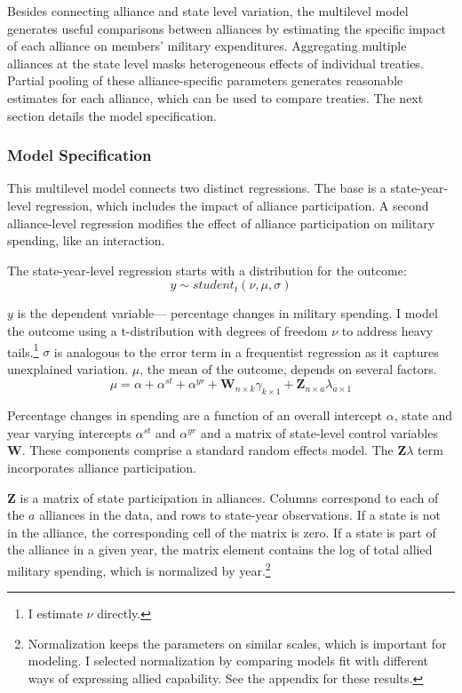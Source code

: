 \documentclass[12pt]{article}
\begin{document}
Besides connecting alliance and state level variation, the multilevel model generates useful comparisons between alliances by estimating the specific impact of each alliance on members' military expenditures. 
Aggregating multiple alliances at the state level masks heterogeneous effects of individual treaties. 
Partial pooling of these alliance-specific parameters generates reasonable estimates for each alliance, which can be used to compare treaties. 
The next section details the model specification. 
 


\subsubsection{Model Specification} 

This multilevel model connects two distinct regressions. 
The base is a state-year-level regression, which includes the impact of alliance participation.
A second alliance-level regression modifies the effect of alliance participation on military spending, like an interaction. 


The state-year-level regression starts with a distribution for the outcome:
\begin{equation}
y \sim student_t(\nu, \mu, \sigma)
\end{equation}
 

$y$ is the dependent variable--- percentage changes in military spending. 
I model the outcome using a t-distribution with degrees of freedom $\nu$ to address heavy tails.\footnote{I estimate $\nu$ directly.}
$\sigma$ is analogous to the error term in a frequentist regression as it captures unexplained variation.  
$\mu$, the mean of the outcome, depends on several factors.
\begin{equation}
\mu = \alpha + \alpha^{st} + \alpha^{yr} +\textbf{W}_{n \times k} \gamma_{k \times 1}  + \textbf{Z}_{n \times a} \lambda_{a \times 1} 
\end{equation}


Percentage changes in spending are a function of an overall intercept $\alpha$, state and year varying intercepts $\alpha^{st}$ and $\alpha^{yr}$ and a matrix of state-level control variables $\textbf{W}$.
These components comprise a standard random effects model. 
The $\textbf{Z} \lambda$ term incorporates alliance participation.


$\textbf{Z}$ is a matrix of state participation in alliances. 
Columns correspond to each of the $a$ alliances in the data, and rows to state-year observations. 
If a state is not in the alliance, the corresponding cell of the matrix is zero.
If a state is part of the alliance in a given year, the matrix element contains the log of total allied military spending, which is normalized by year.\footnote{Normalization keeps the parameters on similar scales, which is important for modeling. I selected normalization by comparing models fit with different ways of expressing allied capability. See the appendix for these results.} 
\end{document}
